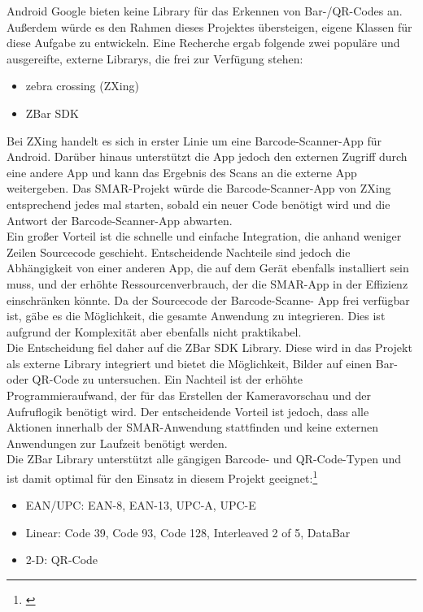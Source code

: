 Android \bzw Google bieten keine Library für das Erkennen von Bar-/QR-Codes an. Außerdem würde es den Rahmen dieses Projektes übersteigen, eigene Klassen für diese Aufgabe zu entwickeln. Eine Recherche ergab folgende zwei populäre und ausgereifte, externe Librarys, die frei zur Verfügung stehen:
\begin{itemize}
	\item zebra crossing (ZXing)
	\item ZBar SDK
\end{itemize}
Bei ZXing handelt es sich in erster Linie um eine Barcode-Scanner-App für Android. Darüber hinaus unterstützt die App jedoch den externen Zugriff durch eine andere App und kann das Ergebnis des Scans an die externe App weitergeben. Das \ac{SMAR}-Projekt würde die Barcode-Scanner-App von ZXing entsprechend jedes mal starten, sobald ein neuer Code benötigt wird und die Antwort der Barcode-Scanner-App abwarten.\\
Ein großer Vorteil ist die schnelle und einfache Integration, die anhand weniger Zeilen Sourcecode geschieht. Entscheidende Nachteile sind jedoch die Abhängigkeit von einer anderen App, die auf dem Gerät ebenfalls installiert sein muss, und der erhöhte Ressourcenverbrauch, der die \ac{SMAR}-App in der Effizienz einschränken könnte. Da der Sourcecode der Barcode-Scanne- App frei verfügbar ist, gäbe es die Möglichkeit, die gesamte Anwendung zu integrieren. Dies ist aufgrund der Komplexität aber ebenfalls nicht praktikabel.\\

Die Entscheidung fiel daher auf die ZBar SDK Library. Diese wird in das Projekt als externe Library integriert und bietet die Möglichkeit, Bilder auf einen Bar- oder QR-Code zu untersuchen. Ein Nachteil ist der erhöhte Programmieraufwand, der für das Erstellen der Kameravorschau und der Aufruflogik benötigt wird. Der entscheidende Vorteil ist jedoch, dass alle Aktionen innerhalb der \ac{SMAR}-Anwendung stattfinden und keine externen Anwendungen zur Laufzeit benötigt werden.\\

Die ZBar Library unterstützt alle gängigen Barcode- und QR-Code-Typen und ist damit optimal für den Einsatz in diesem Projekt geeignet:\footnote{\citep{zbar}}
\begin{itemize}
	\item EAN/UPC: EAN-8, EAN-13, UPC-A, UPC-E
	\item Linear: Code 39, Code 93, Code 128, Interleaved 2 of 5, DataBar
	\item 2-D: QR-Code
\end{itemize}

